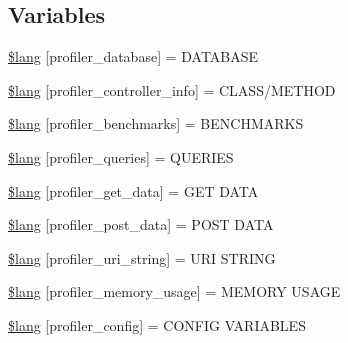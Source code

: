 \subsection*{Variables}
\begin{DoxyCompactItemize}
\item 
\hyperlink{profiler__lang_8php_a93beea1bc75788ad2b7d3d3895984282}{\$lang} \mbox{[}\textquotesingle{}profiler\+\_\+database\textquotesingle{}\mbox{]} = \textquotesingle{}D\+A\+T\+A\+B\+A\+S\+E\textquotesingle{}
\item 
\hyperlink{profiler__lang_8php_a13e794a194b3fae4ac89472fa90a39a4}{\$lang} \mbox{[}\textquotesingle{}profiler\+\_\+controller\+\_\+info\textquotesingle{}\mbox{]} = \textquotesingle{}C\+L\+A\+S\+S/M\+E\+T\+H\+O\+D\textquotesingle{}
\item 
\hyperlink{profiler__lang_8php_a542e9f6b34cf149d1574a8f6b2c9568d}{\$lang} \mbox{[}\textquotesingle{}profiler\+\_\+benchmarks\textquotesingle{}\mbox{]} = \textquotesingle{}B\+E\+N\+C\+H\+M\+A\+R\+K\+S\textquotesingle{}
\item 
\hyperlink{profiler__lang_8php_ac8efd051248fb102a6cc0c9b418ffd6d}{\$lang} \mbox{[}\textquotesingle{}profiler\+\_\+queries\textquotesingle{}\mbox{]} = \textquotesingle{}Q\+U\+E\+R\+I\+E\+S\textquotesingle{}
\item 
\hyperlink{profiler__lang_8php_aed0d74a29b2ef17977baa94091d06058}{\$lang} \mbox{[}\textquotesingle{}profiler\+\_\+get\+\_\+data\textquotesingle{}\mbox{]} = \textquotesingle{}G\+E\+T D\+A\+T\+A\textquotesingle{}
\item 
\hyperlink{profiler__lang_8php_a6b2928f829db3649049332dc4468018d}{\$lang} \mbox{[}\textquotesingle{}profiler\+\_\+post\+\_\+data\textquotesingle{}\mbox{]} = \textquotesingle{}P\+O\+S\+T D\+A\+T\+A\textquotesingle{}
\item 
\hyperlink{profiler__lang_8php_a1f1644f4e586555cb83f718552502136}{\$lang} \mbox{[}\textquotesingle{}profiler\+\_\+uri\+\_\+string\textquotesingle{}\mbox{]} = \textquotesingle{}U\+R\+I S\+T\+R\+I\+N\+G\textquotesingle{}
\item 
\hyperlink{profiler__lang_8php_aaffc8cc3dd25f21388a6edb5fbfc8859}{\$lang} \mbox{[}\textquotesingle{}profiler\+\_\+memory\+\_\+usage\textquotesingle{}\mbox{]} = \textquotesingle{}M\+E\+M\+O\+R\+Y U\+S\+A\+G\+E\textquotesingle{}
\item 
\hyperlink{profiler__lang_8php_a68a43f2ac48abfc21cd12ee19e75e421}{\$lang} \mbox{[}\textquotesingle{}profiler\+\_\+config\textquotesingle{}\mbox{]} = \textquotesingle{}C\+O\+N\+F\+I\+G V\+A\+R\+I\+A\+B\+L\+E\+S\textquotesingle{}

\end{DoxyCompactItemize}
